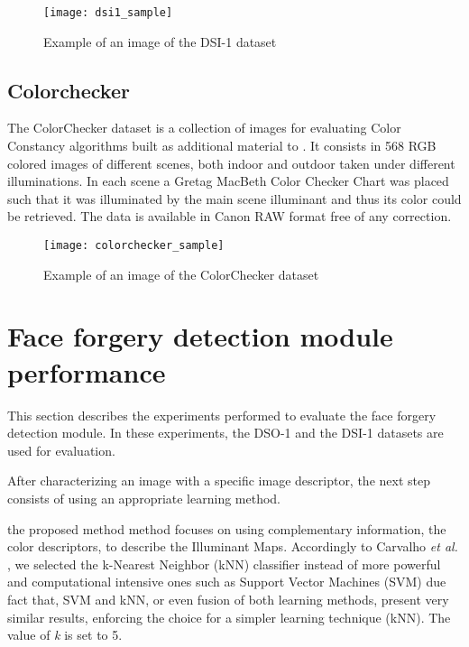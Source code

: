 \begin{figure}[h!]
  \centering
    \texttt{[image: dsi1\_sample]}
    \caption{Example of an image of the DSI-1 dataset}
    \label{fig:dsisample}
\end{figure}

\subsection{Colorchecker}

The ColorChecker dataset is a collection of images for evaluating Color Constancy algorithms built as additional material to \cite{gehler2008bayesian}. It consists in 568 RGB colored images of different scenes, both indoor and outdoor taken under different illuminations. In each scene a Gretag MacBeth Color Checker Chart was placed such that it was illuminated by the main scene illuminant and thus its color could be retrieved. The data is available in Canon RAW format free of any correction.

\begin{figure}[h!]
  \centering
    \texttt{[image: colorchecker\_sample]}
    \caption{Example of an image of the ColorChecker dataset}
    \label{fig:colorcheckersample}
\end{figure}

\section{Face forgery detection module performance}

This section describes the experiments performed to evaluate the face forgery detection module. In these experiments, the DSO-1 and the DSI-1 datasets are used for evaluation.

After characterizing an image with a specific image descriptor, the next step consists of using an appropriate learning method.

the proposed method method focuses on using complementary information, the color descriptors, to describe the Illuminant Maps. Accordingly to Carvalho \emph{et al. }\cite{carvalho2016illuminant}, we selected the k-Nearest Neighbor (kNN) classifier instead of more powerful and computational intensive ones such as Support Vector Machines (SVM) due fact that, SVM and kNN, or even fusion of both learning methods, present very similar results, enforcing the choice for a simpler learning technique (kNN)\cite{carvalho2016illuminant}. The value of \emph{k} is set to 5. 


